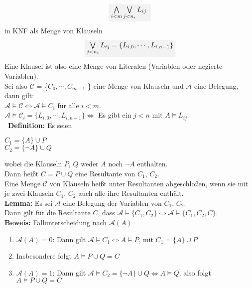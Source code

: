 \documentclass[a4paper]{scrartcl}
\begin{document}
$$\colorbox{light-gray}{$\bigwedge \limits_{i<m}\bigvee\limits_{j<n_{i}} L_{ij}$ } $$
in KNF als Menge von Klauseln \\
$$\colorbox{light-gray}{$\bigvee\limits_{j<n_{i}} L_{ij} = \{L_{i,0}, \cdots, L_{i,n-1}\}$}$$
Eine Klausel ist also eine Menge von Literalen (Variablen oder negierte Variablen). \medskip\\
Sei also $\mathcal{C}$ = \{$C_{0}, \cdots , C_{m-1}$ \} eine Menge von Klauseln und $\mathcal{A}$ eine Belegung, dann gilt:\medskip\\
$\mathcal{A} \models \mathcal{C} \Leftrightarrow \mathcal{A} \models C_{i}$ für alle $i < m$. \medskip\\
$\mathcal{A} \models \mathcal{C}_{i} = \{L_{i,0},\cdots, L_{i,n-1}\} \Leftrightarrow$ Es gibt ein $j<n$ mit $A \models L_{ij}$ \bigskip\\\
\textbf{Definition:} Es seien
\begin{flalign*}
	\colorbox{light-gray}{$C_{1} = \{      A \}\cup P $} \\
	\colorbox{light-gray}{$C_{2} = \{ \neg A \}\cup Q$}
\end{flalign*}
wobei die Klauseln $P$, $Q$ weder $A$ noch $\neg A$ enthalten. \bigskip\\
Dann heißt \colorbox{light-gray}{$C = P \cup Q $} eine Resultante von $C_{1}$, $C_{2}$.\\ 
Eine Menge $\mathcal{C}$ von Klauseln heißt unter Resultanten abgeschloßen, wenn sie mit je zwei Klauseln $C_{1}$, $C_{2}$ auch alle ihre Resultanten enthält. \bigskip\\


\textbf{Lemma:} Es sei $\mathcal{A}$ eine Belegung der Variablen von $C_{1}$, $C_{2}$.\\
Dann gilt für die Resultante $C$, dass 
\colorbox{light-gray}{$\mathcal{A} \models \{ C_{1},C_{2} \} \Leftrightarrow \mathcal{A} \models \{ C_{1},C_{2}, C \}$}.\medskip\\

\textbf{Beweis:} Fallunterscheidung nach $\mathcal{A}(A)$
\begin{enumerate}
      \item $\mathcal{A}(A)=0$: Dann gilt \colorbox{light-gray}{$\mathcal{A}\models C_{1} \Leftrightarrow A \models P$, mit $C_{1} = \{A\} \cup P$}
      \item[] Insbesondere folgt $A \models P \cup Q = C$
      \item $\mathcal{A}(A)= 1$: Dann gilt \colorbox{light-gray}{$\mathcal{A} \models C_{2} = \{ \neg A \} \cup Q \Leftrightarrow A \models Q$, also folgt $A \models P \cup Q = C$  }
  \end{enumerate}
\end{document}
